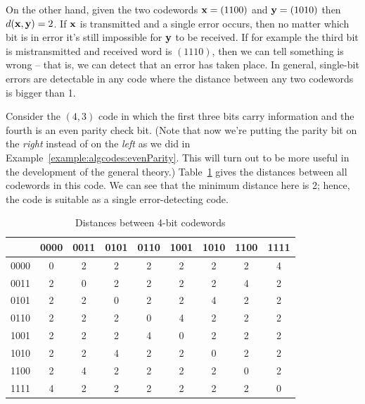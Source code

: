 On the other hand, given the two codewords ${\bold x} = (1100)$
and ${\bold y} = (1010)$ then $d({\bold x}, {\bold y})
= 2$. If ${\bold x}$ is transmitted and a single error occurs, then no matter which bit is in error it's still impossible for 
${\bold y}$ to be received. If for example the third bit is mistransmitted and received word is $(1110)$, then we can tell something is wrong -- that is, we can detect that an error has taken place. In general, single-bit errors are detectable in any code where the distance between any two codewords is bigger than 1.

\begin{example}{} Consider the $(4,3)$ code in which the first three bits carry
information and the fourth is an even parity check bit. (Note that now we're putting the parity bit on the \emph{right} instead of on the \emph{left} as we did in Example~\ref{example:algcodes:evenParity}. This will turn out to be more useful in the development of the general theory.)
Table~\ref{algcodes:table1} gives the distances
between all codewords in this code.  We can see
that the minimum distance here is 2; hence, the code is suitable as
a single error-detecting code. 
  
\begin{table}[hbt]
\caption{Distances between 4-bit codewords\label{algcodes:table1}}{\small
\begin{center}
\begin{tabular}{|c|cccccccc|}
\hline
    & 0000 & 0011 & 0101 & 0110 & 1001 & 1010 & 1100 & 1111
\\ \hline
0000 & 0 & 2 & 2 & 2 & 2 & 2 & 2 & 4 \\
0011 & 2 & 0 & 2 & 2 & 2 & 2 & 4 & 2 \\
0101 & 2 & 2 & 0 & 2 & 2 & 4 & 2 & 2 \\
0110 & 2 & 2 & 2 & 0 & 4 & 2 & 2 & 2 \\
1001 & 2 & 2 & 2 & 4 & 0 & 2 & 2 & 2 \\
1010 & 2 & 2 & 4 & 2 & 2 & 0 & 2 & 2 \\
1100 & 2 & 4 & 2 & 2 & 2 & 2 & 0 & 2 \\
1111 & 4 & 2 & 2 & 2 & 2 & 2 & 2 & 0 \\
\hline
\end{tabular}
\end{center}
}
\end{table}
\end{example}
 
